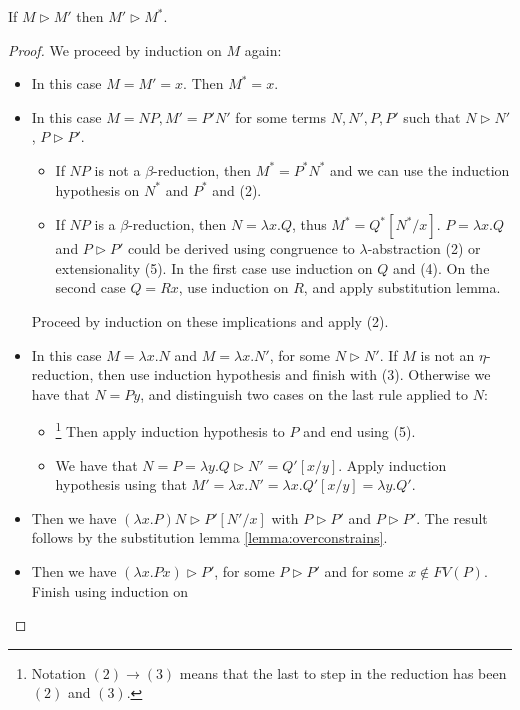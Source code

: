 \begin{lemma}\label{lemma:cr2}
  If $M\triangleright M'$ then $M'\triangleright M^*$.
\end{lemma}
\begin{proof}
  We proceed by induction on $M$ again:
  \begin{itemize}

  \item[(1)] In this case $M=M'=x$. Then $M^*=x$.
  \item[(2)] In this case $M=NP, M'=P'N'$ for some terms $N,N',P,P'$ such that $N\triangleright N'$, $P\triangleright P'$.
    \begin{itemize}
    \item If $NP$ is not a $\beta$-reduction, then $M^* = P^*N^*$ and we can use the  induction hypothesis on $N^*$ and $P^*$ and (2).
    \item If $NP$ is a $\beta$-reduction, then $N = \lambda x. Q$, thus $M^* = Q^*[N^*/x]$. $P = \lambda x.Q$ and $P \triangleright P'$ could be derived using congruence to $\lambda$-abstraction (2) or extensionality (5). In the first case use induction on $Q$ and (4). On the second case $Q=Rx$, use induction on $R$, and apply substitution lemma.
    \end{itemize}

    Proceed by induction on these implications and apply (2).
  \item[(3)] In this case $M=\lambda x.N$ and $M=\lambda x.N'$, for some $N\triangleright N'$. If $M$ is not an $\eta$-reduction, then use induction hypothesis and finish with (3). Otherwise we have that $N = Py$, and distinguish two cases on the last rule applied to $N$:
    \begin{itemize}
    \item[(2)\to (3)]\footnote{Notation $(2)\to (3)$ means that the last to step in the reduction has been $(2)$ and $(3)$.} Then apply induction hypothesis to $P$ and end using (5).
    \item[(4)\to (3)] We have that $N = P = \lambda y.Q \triangleright N' = Q'[x/y]$. Apply induction hypothesis using that $M ' = \lambda x.N' = \lambda x.Q'[x/y] = \lambda y. Q'$.
    \end{itemize}
  \item[(4)] Then we have $(\lambda x.P)N \triangleright P'[N'/x]$ with $P \triangleright P'$ and $P \triangleright P'$. The result follows by the substitution lemma \ref{lemma:overconstrains}.
  \item[(5)] Then we have $(\lambda x.Px) \triangleright P'$, for some $P\triangleright P'$ and for some $x \not  \in FV(P)$. Finish using induction on 
  \end{itemize}
\end{proof}



